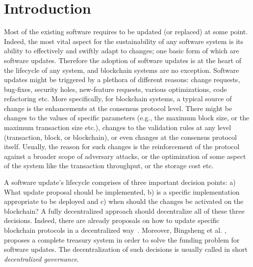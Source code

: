 \section{Introduction}

Most of the existing software requires to be updated (or replaced) at some point. Indeed, the most vital aspect for the sustainability of any software system is its ability to effectively and swiftly adapt to changes; one basic form of which are software updates. Therefore the adoption of software updates is at the heart of the lifecycle of any system, and blockchain systems are no exception. Software updates might be triggered by a plethora of different reasons: change requests, bug-fixes, security holes, new-feature requests, various optimizations, code refactoring etc.
More specifically, for blockchain systems, a typical source of change is the 
enhancements at the consensus protocol level. There might be changes to the 
values of specific parameters (e.g., the maximum block size, or the maximum 
transaction size etc.), changes to the validation rules at any level 
(transaction, block, or blockchain), or even changes at the consensus protocol 
itself. Usually, the reason for such changes is the reinforcement of the 
protocol against a broader scope of adversary attacks, or the optimization of 
some aspect of the system like the transaction throughput, or the storage cost 
etc.

A software update's lifecycle comprises of three important decision points: a) 
What update proposal should be implemented, b) is a specific implementation 
appropriate to be deployed and c) when should the changes be activated on the 
blockchain? A fully decentralized approach should decentralize all of these 
three decisions. Indeed, there are already proposals on how to update specific 
blockchain protocols in a decentralized way~\cite{dash,decred,tezos}. Moreover, 
Bingsheng et al. \cite{NDSS:ZhaOliBal19}, proposes a complete treasury system in
order to solve the funding problem for software updates. The decentralization 
of such decisions is usually called in short \emph{decentralized governance}.

